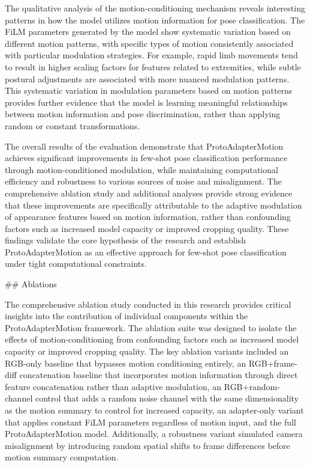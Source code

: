 \documentclass[11pt]{article}
\begin{document}
The qualitative analysis of the motion-conditioning mechanism reveals interesting patterns in how the model utilizes motion information for pose classification. The FiLM parameters generated by the model show systematic variation based on different motion patterns, with specific types of motion consistently associated with particular modulation strategies. For example, rapid limb movements tend to result in higher scaling factors for features related to extremities, while subtle postural adjustments are associated with more nuanced modulation patterns. This systematic variation in modulation parameters based on motion patterns provides further evidence that the model is learning meaningful relationships between motion information and pose discrimination, rather than applying random or constant transformations.

The overall results of the evaluation demonstrate that ProtoAdapterMotion achieves significant improvements in few-shot pose classification performance through motion-conditioned modulation, while maintaining computational efficiency and robustness to various sources of noise and misalignment. The comprehensive ablation study and additional analyses provide strong evidence that these improvements are specifically attributable to the adaptive modulation of appearance features based on motion information, rather than confounding factors such as increased model capacity or improved cropping quality. These findings validate the core hypothesis of the research and establish ProtoAdapterMotion as an effective approach for few-shot pose classification under tight computational constraints.

## Ablations

The comprehensive ablation study conducted in this research provides critical insights into the contribution of individual components within the ProtoAdapterMotion framework. The ablation suite was designed to isolate the effects of motion-conditioning from confounding factors such as increased model capacity or improved cropping quality. The key ablation variants included an RGB-only baseline that bypasses motion conditioning entirely, an RGB+frame-diff concatenation baseline that incorporates motion information through direct feature concatenation rather than adaptive modulation, an RGB+random-channel control that adds a random noise channel with the same dimensionality as the motion summary to control for increased capacity, an adapter-only variant that applies constant FiLM parameters regardless of motion input, and the full ProtoAdapterMotion model. Additionally, a robustness variant simulated camera misalignment by introducing random spatial shifts to frame differences before motion summary computation.
\end{document}

